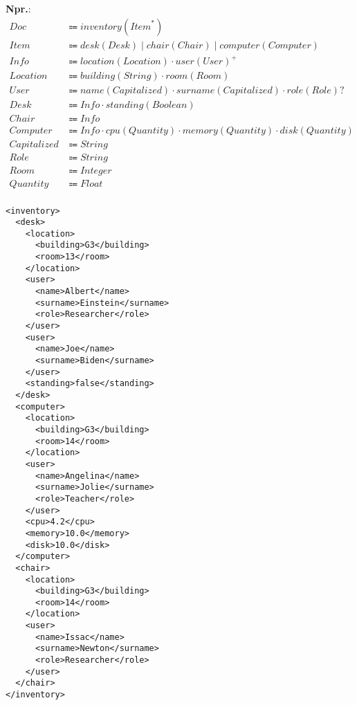 \documentclass{report}
\newcommand{\Ex}{\textbf{Npr.}:\ }
\newcommand{\Seq}{\cdot}
\newcommand{\Union}{\mathrel{|}}
\newcommand{\Kleene}[1]{{#1}^\ast}
\newcommand{\Opt}[1]{#1?}
\newcommand{\KleenePlus}[1]{#1^+}
\newcommand{\Arrow}{\Coloneq}
\begin{document}
\Ex
\begin{equation*}
  \begin{aligned}
    Doc &\Arrow inventory(\Kleene{Item})\\
    Item &\Arrow desk(Desk) \Union chair(Chair) \Union computer(Computer) \\
    Info &\Arrow location(Location) \Seq \KleenePlus{user(User)}\\
    Location &\Arrow building(String) \Seq room(Room)\\
    User &\Arrow name(Capitalized) \Seq surname(Capitalized) \Seq \Opt{role(Role)}\\
    Desk &\Arrow Info \Seq standing(Boolean)\\
    Chair &\Arrow Info\\
    Computer &\Arrow Info \Seq cpu(Quantity) \Seq memory(Quantity) \Seq disk(Quantity)\\
    Capitalized &\Arrow String\\
    Role &\Arrow String\\
    Room &\Arrow Integer\\
    Quantity &\Arrow Float\\
  \end{aligned}
\end{equation*}
\newpage

\begin{lstlisting}
<inventory>
  <desk>
    <location>
      <building>G3</building>
      <room>13</room>
    </location>
    <user>
      <name>Albert</name>
      <surname>Einstein</surname>
      <role>Researcher</role>
    </user>
    <user>
      <name>Joe</name>
      <surname>Biden</surname>
    </user>
    <standing>false</standing>
  </desk>
  <computer>
    <location>
      <building>G3</building>
      <room>14</room>
    </location>
    <user>
      <name>Angelina</name>
      <surname>Jolie</surname>
      <role>Teacher</role>
    </user>
    <cpu>4.2</cpu>
    <memory>10.0</memory>
    <disk>10.0</disk>
  </computer>
  <chair>
    <location>
      <building>G3</building>
      <room>14</room>
    </location>
    <user>
      <name>Issac</name>
      <surname>Newton</surname>
      <role>Researcher</role>
    </user>
  </chair>
</inventory>
\end{lstlisting}
\end{document}
